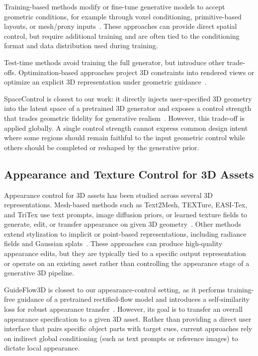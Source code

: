 Training-based methods modify or fine-tune generative models to accept geometric conditions, for example through voxel conditioning, primitive-based layouts, or mesh/proxy inputs~\cite{NEURIPS2022_40e56dab, 10.1145/3641519.3657461}. These approaches can provide direct spatial control, but require additional training and are often tied to the conditioning format and data distribution used during training. 

Test-time methods avoid training the full generator, but introduce other trade-offs. Optimization-based approaches project 3D constraints into rendered views or optimize an explicit 3D representation under geometric guidance~\cite{Metzer_2023_CVPR,10.1145/3641519.3657425}. 

SpaceControl is closest to our work: it directly injects user-specified 3D geometry into the latent space of a pretrained 3D generator and exposes a control strength that trades geometric fidelity for generative realism~\cite{fedele2025spacecontrol}. However, this trade-off is applied globally. A single control strength cannot express common design intent where some regions should remain faithful to the input geometric control while others should be completed or reshaped by the generative prior. 

\subsection{Appearance and Texture Control for 3D Assets} 
\label{sec:rw_appearance_control}

Appearance control for 3D assets has been studied across several 3D representations. Mesh-based methods such as Text2Mesh, TEXTure, EASI-Tex, and TriTex use text prompts, image diffusion priors, or learned texture fields to generate, edit, or transfer appearance on given 3D geometry~\cite{text2mesh, 10.1145/3588432.3591503,perla2024easitex, Cohen-Bar_2025_CVPR}. Other methods extend stylization to implicit or point-based representations, including radiance fields and Gaussian splats~\cite{liu2023stylerf,liu2023stylegaussian,10.1007/978-3-031-85187-2_15}. These approaches can produce high-quality appearance edits, but they are typically tied to a specific output representation or operate on an existing asset rather than controlling the appearance stage of a generative 3D pipeline.

GuideFlow3D is closest to our appearance-control setting, as it performs training-free guidance of a pretrained rectified-flow model and introduces a self-similarity loss for robust appearance transfer~\cite{sayandsarkar_2025_guideflow3d}.  However, its goal is to transfer an overall appearance specification to a given 3D asset. Rather than providing a direct user interface that pairs specific object parts with target cues, current approaches rely on indirect global conditioning (such as text prompts or reference images) to dictate local appearance.



